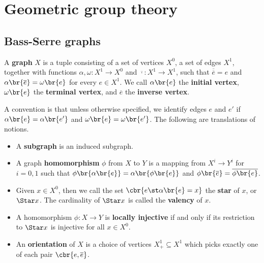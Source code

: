 \section{Geometric group theory}

\subsection{Bass-Serre graphs}

\begin{definition}
A \textbf{graph} $ X $ is a tuple consisting of a set of vertices $ X^0 $, a set of edges $ X^1 $, together with functions $ \alpha, \omega : X^1 \to X^0 $ and $ \overline{\cdot} : X^1 \to X^1 $, such that $ \overline{\overline{e}} = e $ and $ \alpha\br{\overline{e}} = \omega\br{e} $ for every $ e \in X^1 $. We call $ \alpha\br{e} $ the \textbf{initial vertex}, $ \omega\br{e} $ the \textbf{terminal vertex}, and $ \overline{e} $ the \textbf{inverse vertex}.
\end{definition}

A convention is that unless otherwise specified, we identify edges $ e $ and $ e' $ if $ \alpha\br{e} = \alpha\br{e'} $ and $ \omega\br{e} = \omega\br{e'} $. The following are translations of notions.
\begin{itemize}
\item A \textbf{subgraph} is an induced subgraph.
\item A graph \textbf{homomorphism} $ \phi $ from $ X $ to $ Y $ is a mapping from $ X^i \to Y^i $ for $ i = 0, 1 $ such that $ \phi\br{\alpha\br{e}} = \alpha\br{\phi\br{e}} $ and $ \phi\br{\overline{e}} = \overline{\phi\br{e}} $.
\item Given $ x \in X^0 $, then we call the set $ \cbr{e \st \alpha\br{e} = x} $ the \textbf{star} of $ x $, or $ \Star x $. The cardinality of $ \Star x $ is called the \textbf{valency} of $ x $.
\item A homomorphism $ \phi : X \to Y $ is \textbf{locally injective} if and only if its restriction to $ \Star x $ is injective for all $ x \in X^0 $.
\item An \textbf{orientation} of $ X $ is a choice of vertices $ X_+^1 \subseteq X^1 $ which picks exactly one of each pair $ \cbr{e, \overline{e}} $.
\end{itemize}

